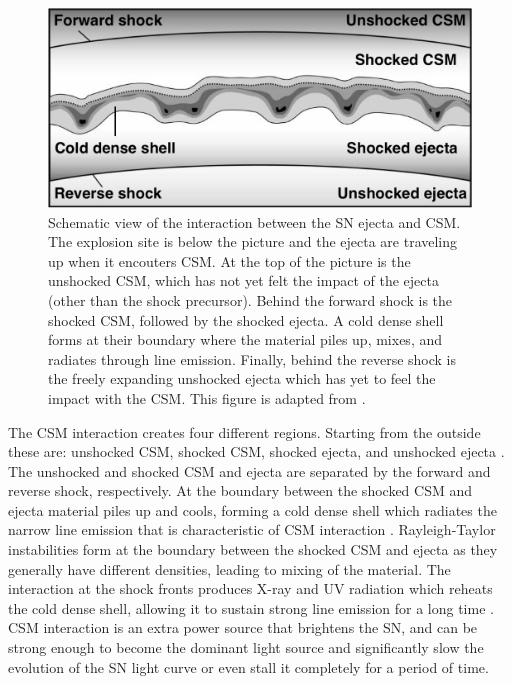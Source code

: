 \documentclass[a4paper,oneside,12pt, class=Latex/Classes/PhDthesisPSnPDF, crop=false]{standalone}
\begin{document}
\begin{figure}
    \centering
    \includegraphics[width=\textwidth]{../Images/chapter_1/CSM_interaction_sketch.png}
    \caption[Schematic view of the CSM interaction region.]{Schematic view of the interaction between the SN ejecta and CSM. The explosion site is below the picture and the ejecta are traveling up when it encouters CSM. At the top of the picture is the unshocked CSM, which has not yet felt the impact of the ejecta (other than the shock precursor). Behind the forward shock is the shocked CSM, followed by the shocked ejecta. A cold dense shell forms at their boundary where the material piles up, mixes, and radiates through line emission. Finally, behind the reverse shock is the freely expanding unshocked ejecta which has yet to feel the impact with the CSM. This figure is adapted from \citet{2006tf_CSM_interaction}.}
    \label{Ia-CSM_interaction_sketch}
\end{figure}

The CSM interaction creates four different regions. Starting from the outside these are: unshocked CSM, shocked CSM, shocked ejecta, and unshocked ejecta \citep[see figure~\ref{Ia-CSM_interaction_sketch}, which is adapted from ][]{2006tf_CSM_interaction}. The unshocked and shocked CSM and ejecta are separated by the forward and reverse shock, respectively. At the boundary between the shocked CSM and ejecta material piles up and cools, forming a cold dense shell which radiates the narrow line emission that is characteristic of CSM interaction \citep{Interacting_SNe_HoSN}. Rayleigh-Taylor instabilities form at the boundary between the shocked CSM and ejecta as they generally have different densities, leading to mixing of the material. The interaction at the shock fronts produces X-ray and UV radiation which reheats the cold dense shell, allowing it to sustain strong line emission for a long time \citep{CSM_interaction_HoSN}. CSM interaction is an extra power source that brightens the SN, and can be strong enough to become the dominant light source and significantly slow the evolution of the SN light curve or even stall it completely for a period of time.
\end{document}
